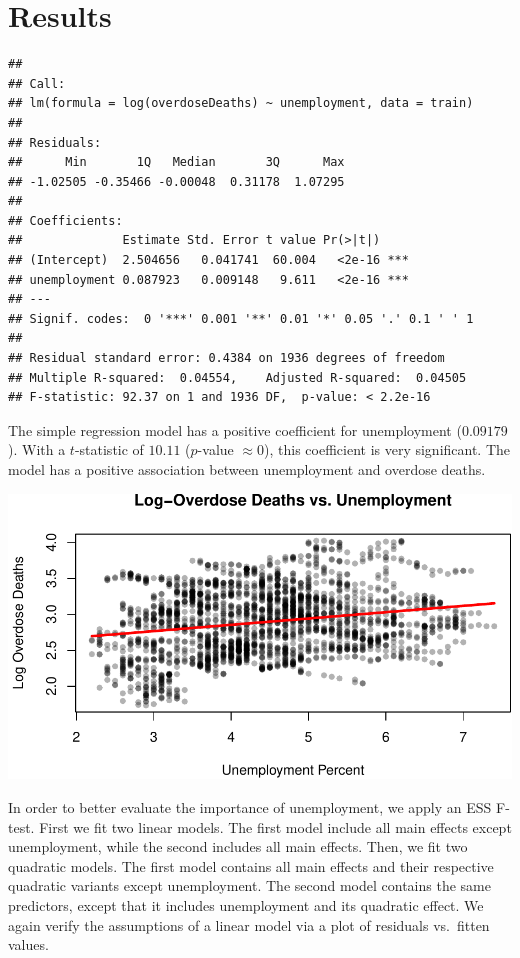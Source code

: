 \documentclass[]{article}
\begin{document}
\section{Results}

\begin{verbatim}
## 
## Call:
## lm(formula = log(overdoseDeaths) ~ unemployment, data = train)
## 
## Residuals:
##      Min       1Q   Median       3Q      Max 
## -1.02505 -0.35466 -0.00048  0.31178  1.07295 
## 
## Coefficients:
##              Estimate Std. Error t value Pr(>|t|)    
## (Intercept)  2.504656   0.041741  60.004   <2e-16 ***
## unemployment 0.087923   0.009148   9.611   <2e-16 ***
## ---
## Signif. codes:  0 '***' 0.001 '**' 0.01 '*' 0.05 '.' 0.1 ' ' 1
## 
## Residual standard error: 0.4384 on 1936 degrees of freedom
## Multiple R-squared:  0.04554,    Adjusted R-squared:  0.04505 
## F-statistic: 92.37 on 1 and 1936 DF,  p-value: < 2.2e-16
\end{verbatim}

The simple regression model has a positive coefficient for unemployment
(\(0.09179\)). With a \(t\)-statistic of \(10.11\) (\(p\)-value
\(\approx 0\)), this coefficient is very significant. The model has a
positive association between unemployment and overdose deaths.

\begin{center}\includegraphics{stat139_project_final_files/figure-latex/unnamed-chunk-4-1} \end{center}

In order to better evaluate the importance of unemployment, we apply an
ESS F-test. First we fit two linear models. The first model include all
main effects except unemployment, while the second includes all main
effects. Then, we fit two quadratic models. The first model contains all
main effects and their respective quadratic variants except
unemployment. The second model contains the same predictors, except that
it includes unemployment and its quadratic effect. We again verify the
assumptions of a linear model via a plot of residuals vs.~fitten values.
\end{document}
